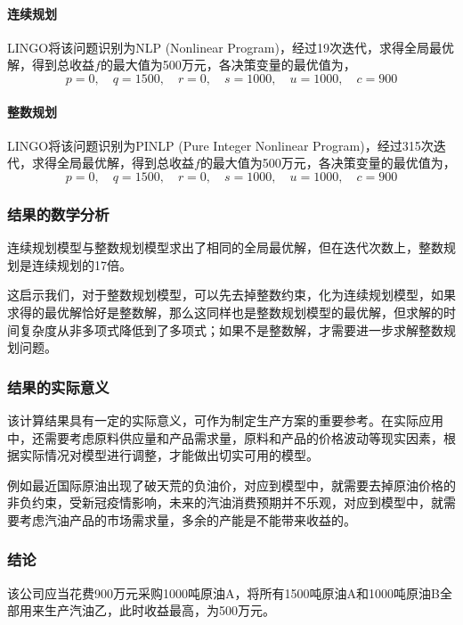 \paragraph{连续规划} LINGO将该问题识别为NLP (Nonlinear Program)，经过19次迭代，求得全局最优解，得到总收益$f$的最大值为500万元，各决策变量的最优值为，
\begin{equation}
    p = 0, \quad q = 1500, \quad r = 0, \quad s = 1000, \quad u = 1000, \quad c = 900
\end{equation}

\paragraph{整数规划} LINGO将该问题识别为PINLP (Pure Integer Nonlinear Program)，经过315次迭代，求得全局最优解，得到总收益$f$的最大值为500万元，各决策变量的最优值为，
\begin{equation}
    p = 0, \quad q = 1500, \quad r = 0, \quad s = 1000, \quad u = 1000, \quad c = 900
\end{equation}

\subsubsection{结果的数学分析}

连续规划模型与整数规划模型求出了相同的全局最优解，但在迭代次数上，整数规划是连续规划的17倍。

这启示我们，对于整数规划模型，可以先去掉整数约束，化为连续规划模型，如果求得的最优解恰好是整数解，那么这同样也是整数规划模型的最优解，但求解的时间复杂度从非多项式降低到了多项式；如果不是整数解，才需要进一步求解整数规划问题。

\subsubsection{结果的实际意义}

该计算结果具有一定的实际意义，可作为制定生产方案的重要参考。在实际应用中，还需要考虑原料供应量和产品需求量，原料和产品的价格波动等现实因素，根据实际情况对模型进行调整，才能做出切实可用的模型。

例如最近国际原油出现了破天荒的负油价，对应到模型中，就需要去掉原油价格的非负约束，受新冠疫情影响，未来的汽油消费预期并不乐观，对应到模型中，就需要考虑汽油产品的市场需求量，多余的产能是不能带来收益的。

\subsubsection{结论}

该公司应当花费900万元采购1000吨原油A，将所有1500吨原油A和1000吨原油B全部用来生产汽油乙，此时收益最高，为500万元。
